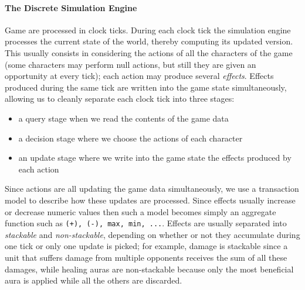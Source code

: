 \paragraph{The Discrete Simulation Engine}
Game are processed in clock ticks. During each clock tick the simulation engine processes the current state of the world, thereby computing its updated version. This usually consists in considering the actions of all the characters of the game (some characters may perform null actions, but still they are given an opportunity at every tick); each action may produce several \textit{effects}.  Effects produced during the same tick are written into the game state simultaneously, allowing us to cleanly separate each clock tick into three stages:

\begin{itemize}
\item a query stage when we read the contents of the game data
\item a decision stage where we choose the actions of each character
\item an update stage where we write into the game state the effects produced by each action
\end{itemize}

Since actions are all updating the game data simultaneously, we use a transaction model to describe how these updates are processed. Since effects usually increase or decrease numeric values then such a model becomes simply an aggregate function such as \texttt{(+), (-), max, min, ...}. Effects are usually separated into \textit{stackable} and \textit{non-stackable}, depending on whether or not they accumulate during one tick or only one update is picked; for example, damage is stackable since a unit that suffers damage from multiple opponents receives the sum of all these damages, while healing auras are non-stackable because only the most beneficial aura is applied while all the others are discarded.